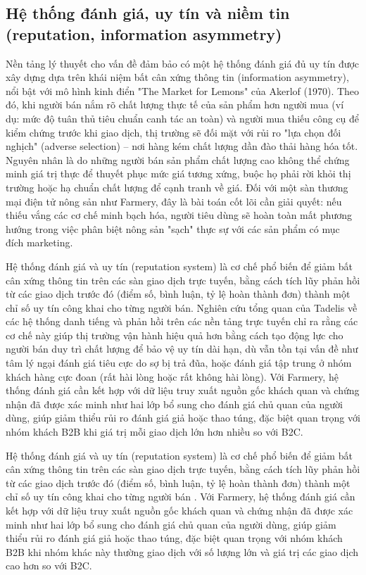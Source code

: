 \subsection{Hệ thống đánh giá, uy tín và niềm tin (reputation, information asymmetry)}


Nền tảng lý thuyết cho vấn đề đảm bảo có một hệ thống đánh giá đủ uy tín được xây dựng dựa trên khái niệm bất cân xứng thông tin (information asymmetry), nổi bật với mô hình kinh điển "The Market for Lemons" của Akerlof (1970). Theo đó, khi người bán nắm rõ chất lượng thực tế của sản phẩm hơn người mua (ví dụ: mức độ tuân thủ tiêu chuẩn canh tác an toàn) và người mua thiếu công cụ để kiểm chứng trước khi giao dịch, thị trường sẽ đối mặt với rủi ro "lựa chọn đối nghịch" (adverse selection) – nơi hàng kém chất lượng dần đào thải hàng hóa tốt. Nguyên nhân là do những người bán sản phẩm chất lượng cao không thể chứng minh giá trị thực để thuyết phục mức giá tương xứng, buộc họ phải rời khỏi thị trường hoặc hạ chuẩn chất lượng để cạnh tranh về giá. Đối với một sàn thương mại điện tử nông sản như Farmery, đây là bài toán cốt lõi cần giải quyết: nếu thiếu vắng các cơ chế minh bạch hóa, người tiêu dùng sẽ hoàn toàn mất phương hướng trong việc phân biệt nông sản "sạch" thực sự với các sản phẩm có mục đích marketing.


Hệ thống đánh giá và uy tín (reputation system) là cơ chế phổ biến để giảm bất cân xứng thông tin trên các sàn giao dịch trực tuyến, bằng cách tích lũy phản hồi từ các giao dịch trước đó (điểm số, bình luận, tỷ lệ hoàn thành đơn) thành một chỉ số uy tín công khai cho từng người bán. Nghiên cứu tổng quan của Tadelis về các hệ thống danh tiếng và phản hồi trên các nền tảng trực tuyến chỉ ra rằng các cơ chế này giúp thị trường vận hành hiệu quả hơn bằng cách tạo động lực cho người bán duy trì chất lượng để bảo vệ uy tín dài hạn, dù vẫn tồn tại vấn đề như tâm lý ngại đánh giá tiêu cực do sợ bị trả đũa, hoặc đánh giá tập trung ở nhóm khách hàng cực đoan (rất hài lòng hoặc rất không hài lòng). Với Farmery, hệ thống đánh giá cần kết hợp với dữ liệu truy xuất nguồn gốc khách quan và chứng nhận đã được xác minh như hai lớp bổ sung cho đánh giá chủ quan của người dùng, giúp giảm thiểu rủi ro đánh giá giả hoặc thao túng, đặc biệt quan trọng với nhóm khách B2B khi giá trị mỗi giao dịch lớn hơn nhiều so với B2C.


Hệ thống đánh giá và uy tín (reputation system) là cơ chế phổ biến để giảm bất cân xứng thông tin trên các sàn giao dịch trực tuyến, bằng cách tích lũy phản hồi từ các giao dịch trước đó (điểm số, bình luận, tỷ lệ hoàn thành đơn) thành một chỉ số uy tín công khai cho từng người bán \cite{springer_article}. Với Farmery, hệ thống đánh giá cần kết hợp với dữ liệu truy xuất nguồn gốc khách quan và chứng nhận đã được xác minh như hai lớp bổ sung cho đánh giá chủ quan của người dùng, giúp giảm thiểu rủi ro đánh giá giả hoặc thao túng, đặc biệt quan trọng với nhóm khách B2B khi nhóm khác này thường giao dịch với số lượng lớn và giá trị các giao dịch cao hơn so với B2C.

